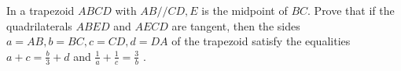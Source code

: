 In a trapezoid $ABCD$ with $AB // CD, E$ is the midpoint of $BC$. Prove that if the quadrilaterals $ABED$ and $AECD$ are tangent, then the sides $a = AB, b = BC, c =CD, d = DA$ of the trapezoid satisfy the equalities $a+c = \frac{b}{3} +d$ and $\frac1a +\frac1c = \frac3b$ .